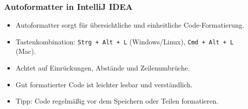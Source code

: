 \documentclass{../../presentation}
\begin{document}
\begin{frame}
  \frametitle{Autoformatter in IntelliJ IDEA}
  \pause
  \begin{itemize}
    \item Autoformatter sorgt für übersichtliche und einheitliche Code-Formatierung.
          \pause
    \item Tastenkombination: \texttt{Strg + Alt + L} (Windows/Linux), \texttt{Cmd + Alt + L} (Mac).
          \pause
    \item Achtet auf Einrückungen, Abstände und Zeilenumbrüche.
          \pause
    \item Gut formatierter Code ist leichter lesbar und verständlich.
          \pause
    \item Tipp: Code regelmäßig vor dem Speichern oder Teilen formatieren.
  \end{itemize}
\end{frame}
\end{document}
